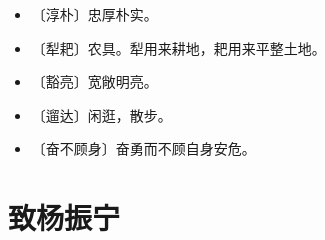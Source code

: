 \documentclass[12pt,UTF-8,openany]{ctexbook}
\begin{document}
\vspace{-1em}

\begin{itemize}
    \setlength\itemsep{-0.2em}
    \item 〔淳朴〕忠厚朴实。
    \item 〔犁耙〕农具。犁用来耕地，耙用来平整土地。
    \item 〔豁亮〕宽敞明亮。
    \item 〔遛达〕闲逛，散步。
    \item 〔奋不顾身〕奋勇而不顾自身安危。
\end{itemize}

\chapter{致杨振宁}
\end{document}
